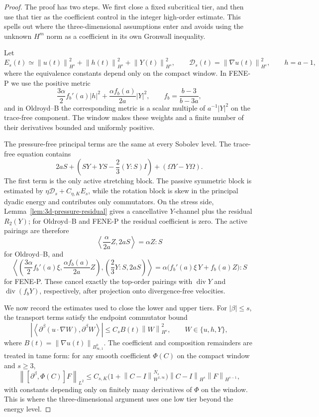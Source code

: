 \documentclass[11pt]{article}
\newcommand{\calD}{\mathcal D}
\newcommand{\norm}[1]{\left\lVert #1\right\rVert}
\begin{document}
\begin{proof}
The proof has two steps.  We first close a fixed subcritical tier, and then use
that tier as the coefficient control in the integer high-order estimate.  This
spells out where the three-dimensional assumptions enter and avoids using the
unknown \(H^m\) norm as a coefficient in its own Gronwall inequality.

Let
\[
  E_s(t)\simeq \norm{u(t)}_{H^s}^2+\norm{h(t)}_{H^s}^2+\norm{Y(t)}_{H^s}^2,
  \qquad
  \calD_s(t)=\norm{\nabla u(t)}_{H^s}^2,
  \qquad h=a-1,
\]
where the equivalence constants depend only on the compact window.  In FENE-P
we use the positive metric
\[
  \frac{3\alpha}{2}f_b'(a)|h|^2+\frac{\alpha f_b(a)}{2a}|Y|^2,
  \qquad f_b=\frac{b-3}{b-3a},
\]
and in Oldroyd--B the corresponding metric is a scalar multiple of
\(a^{-1}|Y|^2\) on the trace-free component.  The window makes these weights and
a finite number of their derivatives bounded and uniformly positive.

The pressure-free principal terms are the same at every Sobolev level.  The
trace-free equation contains
\[
  2aS+\left(SY+YS-\frac23(Y:S)I\right)+(\Omega Y-Y\Omega).
\]
The first term is the only active stretching block.  The passive symmetric
block is estimated by \(\eta\calD_s+C_{\eta,K}E_s\), while the rotation block is
skew in the principal dyadic energy and contributes only commutators.  On the
stress side, Lemma~\ref{lem:3d-pressure-residual} gives a cancellative
\(Y\)-channel plus the residual \(R_2(Y)\); for Oldroyd--B and FENE-P the
residual coefficient is zero.  The active pairings are therefore
\[
  \left\langle \frac{\alpha}{2a}Z,2aS\right\rangle
  =\alpha Z:S
\]
for Oldroyd--B, and
\[
  \left\langle
  \left(\frac{3\alpha}{2}f_b'(a)\xi,\frac{\alpha f_b(a)}{2a}Z\right),
  \left(\frac23Y:S,2aS\right)\right\rangle
  =
  \alpha\bigl(f_b'(a)\xi\,Y+f_b(a)Z\bigr):S
\]
for FENE-P.  These cancel exactly the top-order pairings with
\(\operatorname{div}Y\) and \(\operatorname{div}(f_bY)\), respectively, after
projection onto divergence-free velocities.

We now record the estimates used to close the lower and upper tiers.  For
\(|\beta|\le s\), the transport terms satisfy the endpoint commutator bound
\[
  \left|
  \left\langle \partial^\beta(u\cdot\nabla W),\partial^\beta W\right\rangle
  \right|
  \le
  C_s B(t)\norm{W}_{H^s}^2,
  \qquad W\in\{u,h,Y\},
\]
where \(B(t)=\norm{\nabla u(t)}_{B^0_{\infty,1}}\).  The coefficient and
composition remainders are treated in tame form: for any smooth coefficient
\(\Phi(C)\) on the compact window and \(s\ge3\),
\begin{equation}
  \norm{[\partial^\beta,\Phi(C)]F}_{L^2}
  \le
  C_{s,K}\bigl(1+\norm{C-I}_{W^{1,\infty}}^{N_s}\bigr)
  \norm{C-I}_{H^s}\norm{F}_{H^{s-1}},
  \label{eq:3d-tame-commutator}
\end{equation}
with constants depending only on finitely many derivatives of \(\Phi\) on the
window.  This is where the three-dimensional argument uses one low tier beyond
the energy level.


\end{proof}
\end{document}
